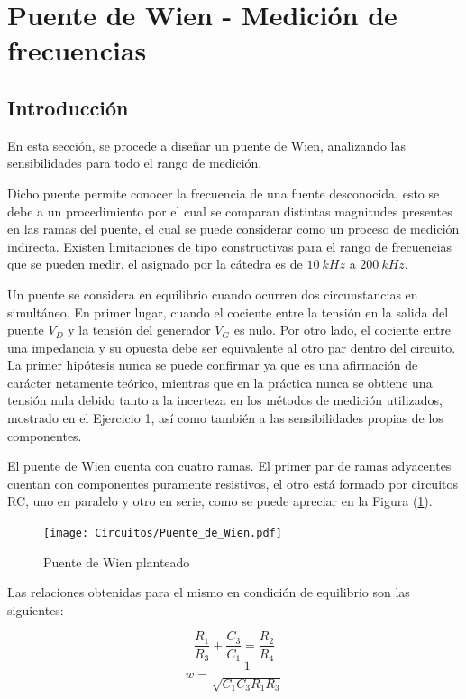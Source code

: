 


\section{Puente de Wien - Medición de frecuencias}

\subsection{Introducción}

En esta sección, se procede a diseñar un puente de Wien, analizando las sensibilidades para todo el rango de medición.

Dicho puente permite conocer la frecuencia de una fuente desconocida, esto se debe a un procedimiento por el cual se comparan distintas magnitudes presentes en las ramas del puente, el cual se puede considerar como un proceso de medición indirecta. Existen limitaciones de tipo constructivas para el rango de frecuencias que se pueden medir, el asignado por la cátedra es de $10 \ kHz$ a $200 \ kHz$.

Un puente se considera en equilibrio cuando ocurren dos circunstancias en simultáneo. En primer lugar, cuando el cociente entre la tensión en la salida del puente $V_D$ y la tensión del generador $V_G$ es nulo. Por otro lado, el cociente entre una impedancia y su opuesta debe ser equivalente al otro par dentro del circuito. La primer hipótesis nunca se puede confirmar ya que es una afirmación de carácter netamente teórico, mientras que en la práctica nunca se obtiene una tensión nula debido tanto a la incerteza en los métodos de medición utilizados, mostrado en el Ejercicio 1, así como también a las sensibilidades propias de los componentes.

El puente de Wien cuenta con cuatro ramas. El primer par de ramas adyacentes cuentan con componentes puramente resistivos, el otro está formado por circuitos RC, uno en paralelo y otro en serie, como se puede apreciar en la Figura (\ref{fig:Puente_de_wien}).

\begin{figure}[H]
\centering
\texttt{[image: Circuitos/Puente\_de\_Wien.pdf]}
\caption{Puente de Wien planteado}
\label{fig:Puente_de_wien}
\end{figure}

Las relaciones obtenidas para el mismo en condición de equilibrio son las siguientes:

\begin{equation}
\frac{R_1}{R_3}+\frac{C_3}{C_1}=\frac{R_2}{R_4}
\end{equation}
\begin{equation}
w=\frac{1}{\sqrt{C_1C_3R_1R_3}}
\end{equation}

